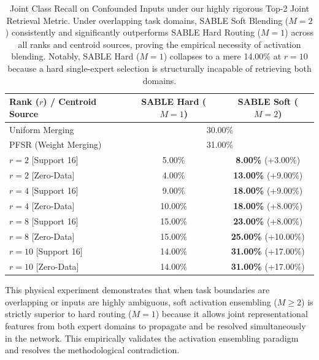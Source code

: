 \begin{table}[htbp]
\caption{Joint Class Recall on Confounded Inputs under our highly rigorous Top-2 Joint Retrieval Metric. Under overlapping task domains, SABLE Soft Blending ($M=2$) consistently and significantly outperforms SABLE Hard Routing ($M=1$) across all ranks and centroid sources, proving the empirical necessity of activation blending. Notably, SABLE Hard ($M=1$) collapses to a mere 14.00\% at $r=10$ because a hard single-expert selection is structurally incapable of retrieving both domains.}
\label{tab:confounded_results}
\vskip 0.1in
\begin{center}
\begin{small}
\begin{sc}
\begin{tabular}{lcc}
\toprule
Rank ($r$) / Centroid Source & SABLE Hard ($M=1$) & SABLE Soft ($M=2$) \\
\midrule
Uniform Merging & \multicolumn{2}{c}{30.00\%} \\
PFSR (Weight Merging) & \multicolumn{2}{c}{31.00\%} \\
\midrule
$r=2$ [Support 16] & 5.00\% & \textbf{8.00\%} (+3.00\%) \\
$r=2$ [Zero-Data] & 4.00\% & \textbf{13.00\%} (+9.00\%) \\
\midrule
$r=4$ [Support 16] & 9.00\% & \textbf{18.00\%} (+9.00\%) \\
$r=4$ [Zero-Data] & 10.00\% & \textbf{18.00\%} (+8.00\%) \\
\midrule
$r=8$ [Support 16] & 15.00\% & \textbf{23.00\%} (+8.00\%) \\
$r=8$ [Zero-Data] & 15.00\% & \textbf{25.00\%} (+10.00\%) \\
\midrule
$r=10$ [Support 16] & 14.00\% & \textbf{31.00\%} (+17.00\%) \\
$r=10$ [Zero-Data] & 14.00\% & \textbf{31.00\%} (+17.00\%) \\
\bottomrule
\end{tabular}
\end{sc}
\end{small}
\end{center}
\vskip -0.1in
\end{table}

This physical experiment demonstrates that when task boundaries are overlapping or inputs are highly ambiguous, soft activation ensembling ($M \ge 2$) is strictly superior to hard routing ($M=1$) because it allows joint representational features from both expert domains to propagate and be resolved simultaneously in the network. This empirically validates the activation ensembling paradigm and resolves the methodological contradiction.

